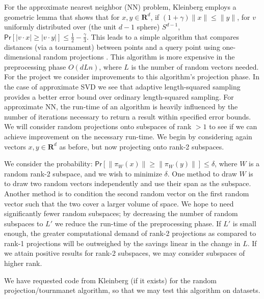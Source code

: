 \documentclass{article}
\begin{document}
For the approximate nearest neighbor (NN) problem, Kleinberg employs a geometric lemma that shows that for $ x,y \in \mathbf{R}^d $, if $ (1 + \gamma) \|x\| \leq \|y\| $, for $v$ uniformly distributed over (the unit $d-1$ sphere) $S^{d-1}$, $\mathsf{Pr}[\vert v \cdot x \vert \geq \vert v \cdot y \vert] \leq \frac{1}{2} - \frac{\gamma}{3} $. This leads to a simple algorithm that compares distances (via a tournament) between points and a query point using one-dimensional random projections \cite{kleinberg1997tan}. This algorithm is more expensive in the preprocessing phase $O(d L n) $, where $L$ is the number of random vectors needed.
For the project we consider improvements to this algorithm's projection phase. In the case of approximate SVD we see that adaptive length-squared sampling provides a better error bound over ordinary length-squared sampling. For approximate NN, the run-time of an algorithm is heavily influenced by the number of iterations necessary to return a result within specified error bounds. We will consider random projections onto subspaces of rank $ > 1 $ to see if we can achieve improvement on the necessary run-time. We begin by considering again vectors $x,y \in  \mathbf{R}^d $ as before, but now projecting onto rank-2 subspaces.

We consider the probability: $ \mathsf{Pr}[\| \pi_W(x) \| \geq \| \pi_W(y) \|] \leq \delta $, where $W$ is a random rank-2 subspace, and we wish to minimize $\delta$. One method to draw $W$ is to draw two random vectors independently and use their span as the subspace. Another method is to condition the second random vector on the first random vector such that the two cover a larger volume of space. We hope to need significantly fewer random subspaces; by decreasing the number of random subspaces to $L'$ we reduce the run-time of the preprocessing phase. If $L'$ is small enough, the greater computational demand of rank-2 projections as compared to rank-1 projections will be outweighed by the savings linear in the change in $L$. If we attain positive results for rank-2 subspaces, we may consider subspaces of higher rank.

We have requested code from Kleinberg (if it exists) for the random projection/tournmanet algorithm, so that we may test this algorithm on datasets.

\end{document}
